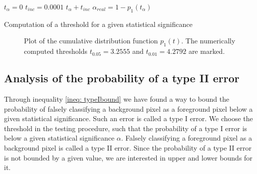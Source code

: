 \documentclass[a4paper,12pt]{article}
\theoremstyle{plain}
\theoremstyle{definition}
\begin{document}
\begin{algorithm}[H]
	$t_\alpha = 0$\;
	$t_{inc} = 0.0001$\;
	{
		$t_\alpha + t_{inc}$\;
		$\alpha_{real} = 1 - p_1(t_\alpha)$\;
	}
	\caption{Computation of a threshold for a given statistical significance}
\end{algorithm}

\begin{figure}[h!]
	\centering
	\caption{Plot of the cumulative distribution function $p_1(t)$. The numerically computed thresholds $t_{0.05} = 3.2555$ and $t_{0.01} = 4.2792$ are marked.}
	\label{fig: cdf}
\end{figure}

\newpage

\subsection{Analysis of the probability of a type II error}\label{section: analyzetypeIIerror}

Through inequality \eqref{ineq: typeIbound} we have found a way to bound the probability of falsely classifying a background pixel as a foreground pixel below a given statistical significance. Such an error is called a type I error. We choose the threshold in the testing procedure, such that the probability of a type I error is below a given statistical significance $\alpha$. Falsely classifying a foreground pixel as a background pixel is called a type II error. Since the probability of a type II error is not bounded by a given value, we are interested in upper and lower bounds for it.
\end{document}
